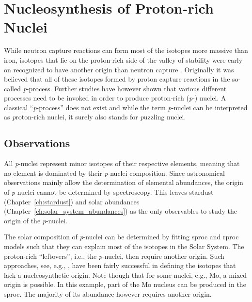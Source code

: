 
\chapter{Nucleosynthesis of Proton-rich Nuclei}

While neutron capture reactions can form most of the isotopes more massive than iron, isotopes that lie on the proton-rich side of the valley of stability were early on recognized to have another origin than neutron capture \citep{burbidge57,cameron57}. Originally it was believed that all of these isotopes formed by proton capture reactions in the so-called \emph{p}-process. Further studies have however shown that various different processes need to be invoked in order to produce proton-rich (\textit{p}-) nuclei. A classical ``\textit{p}-process'' does not exist and while the term \textit{p}-nuclei can be interpreted as \textit{p}roton-rich nuclei, it surely also stands for \textit{p}uzzling nuclei.

\section{Observations}

All \textit{p}-nuclei represent minor isotopes of their respective elements, meaning that no element is dominated by their \textit{p}-nuclei composition. Since astronomical observations mainly allow the determination of elemental abundances, the origin of \textit{p}-nuclei cannot be determined by spectroscopy. This leaves stardust (Chapter~\ref{ch:stardust}) and solar abundances (Chapter~\ref{ch:solar_system_abundances}) as the only observables to study the origin of the \textit{p}-nuclei.

The solar composition of \textit{p}-nuclei can be determined by fitting \ac{sproc} and \ac{rproc} models such that they can explain most of the isotopes in the Solar System. The proton-rich ``leftovers'', i.e., the \textit{p}-nuclei, then require another origin. Such approaches, see, e.g., \citet{bisterzo14}, have been fairly successful in defining the isotopes that lack a nucleosynthetic origin. Note though that for some nuclei, e.g., Mo, a mixed origin is possible. In this example, part of the Mo nucleus can be produced in the \ac{sproc}. The majority of its abundance however requires another origin.

